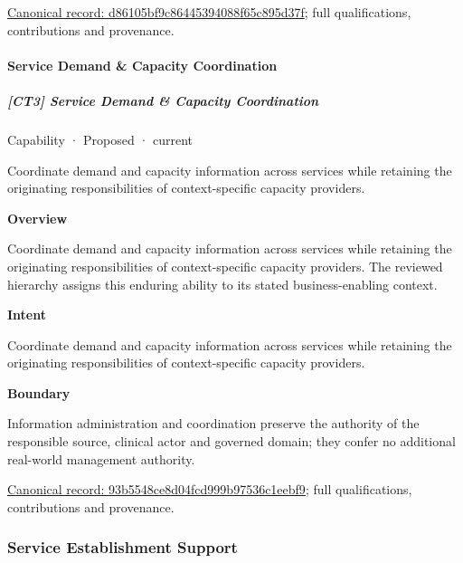 {\footnotesize \href{../../../../continuum/strategy/capability/d86105bf9c86445394088f65c895d37f.md}{Canonical record: d86105bf9c86445394088f65c895d37f}; full qualifications, contributions and provenance.}\par
\paragraph{Service Demand \& Capacity Coordination}

\subparagraph{[CT3] Service Demand \& Capacity Coordination}

\label{element:93b5548ce8d04fcd999b97536c1eebf9}
{\small Capability · Proposed · current}\par

Coordinate demand and capacity information across services while retaining the originating responsibilities of context-specific capacity providers.



\textbf{Overview}



Coordinate demand and capacity information across services while retaining the originating responsibilities of context-specific capacity providers. The reviewed hierarchy assigns this enduring ability to its stated business-enabling context.



\textbf{Intent}



Coordinate demand and capacity information across services while retaining the originating responsibilities of context-specific capacity providers.



\textbf{Boundary}



Information administration and coordination preserve the authority of the responsible source, clinical actor and governed domain; they confer no additional real-world management authority.


{\footnotesize \href{../../../../continuum/strategy/capability/93b5548ce8d04fcd999b97536c1eebf9.md}{Canonical record: 93b5548ce8d04fcd999b97536c1eebf9}; full qualifications, contributions and provenance.}\par
\subsubsection{Service Establishment Support}

